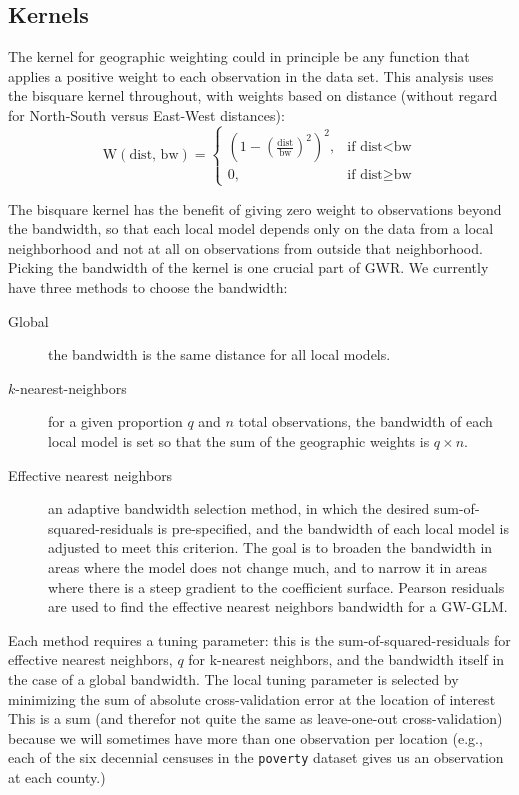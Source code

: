 \documentclass[authoryear ,review]{elsarticle}
\begin{document}
	\subsection{Kernels}
		The kernel for geographic weighting could in principle be any function that applies a positive weight to each observation in the data set. This analysis uses the bisquare kernel throughout, with weights based on distance (without regard for North-South versus East-West distances):
		\[
			\text{W}(\text{dist, bw}) = \begin{cases} (1-(\frac{\text{dist}}{\text{bw}})^2)^2, & \mbox{if dist} < \mbox{bw} \\
			0, & \mbox{if dist} \ge \mbox{bw} \end{cases}
		\]
		
		The bisquare kernel has the benefit of giving zero weight to observations beyond the bandwidth, so that each local model depends only on the data from a local neighborhood and not at all on observations from outside that neighborhood.\\
		
		Picking the bandwidth of the kernel is one crucial part of GWR. We currently have three methods to choose the bandwidth:
		\begin{description}
			\item[Global] the bandwidth is the same distance for all local models.
			\item[$k$-nearest-neighbors] for a given proportion $q$ and $n$ total observations, the bandwidth of each local model is set so that the sum of the geographic weights is $q \times n$.
			\item[Effective nearest neighbors] an adaptive bandwidth selection method, in which the desired sum-of-squared-residuals is pre-specified, and the bandwidth of each local model is adjusted to meet this criterion. The goal is to broaden the bandwidth in areas where the model does not change much, and to narrow it in areas where there is a steep gradient to the coefficient surface. Pearson residuals are used to find the effective nearest neighbors bandwidth for a GW-GLM.
		\end{description}
		
		Each method requires a tuning parameter: this is the sum-of-squared-residuals for effective nearest neighbors, $q$ for k-nearest neighbors, and the bandwidth itself in the case of a global bandwidth. The local tuning parameter is selected by minimizing the sum of absolute cross-validation error at the location of interest This is a sum (and therefor not quite the same as leave-one-out cross-validation) because we will sometimes have more than one observation per location (e.g., each of the six decennial censuses in the \verb~poverty~ dataset gives us an observation at each county.)\\
		
\end{document}
